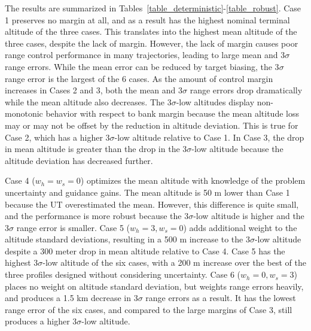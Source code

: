 \documentclass[journal ]{new-aiaa}
\begin{document}

The results are summarized in Tables~\ref{table_deterministic}-\ref{table_robust}. Case 1 preserves no margin at all, and as a result has the highest nominal terminal altitude of the three cases. This translates into the highest mean altitude of the three cases, despite the lack of margin. However, the lack of margin causes poor range control performance in many trajectories, leading to large mean and 3$\sigma$ range errors. While the mean error can be reduced by target biasing, the 3$\sigma$ range error is the largest of the 6 cases. As the amount of control margin increases in Cases 2 and 3, both the mean and 3$\sigma$ range errors drop dramatically while the mean altitude also decreases. The 3$\sigma$-low altitudes display non-monotonic behavior with respect to bank margin because the mean altitude loss may or may not be offset by the reduction in altitude deviation. This is true for Case 2, which has a higher 3$\sigma$-low altitude relative to Case 1. In Case 3, the drop in mean altitude is greater than the drop in the 3$\sigma$-low altitude because the altitude deviation has decreased further. 

Case 4 ($ w_h=w_s=0 $) optimizes the mean altitude with knowledge of the problem uncertainty and guidance gains. The mean altitude is 50 m lower than Case 1 because the UT overestimated the mean. However, this difference is quite small, and the performance is more robust because the 3$\sigma$-low altitude is higher and the 3$\sigma$ range error is smaller. Case 5 ($ w_h=3,w_s=0 $) adds additional weight to the altitude standard deviations, resulting in a 500 m increase to the 3$\sigma$-low altitude despite a 300 meter drop in mean altitude relative to Case 4. Case 5 has the highest 3$\sigma$-low altitude of the six cases, with a 200 m increase over the best of the three profiles designed without considering uncertainty. Case 6 ($ w_h=0, w_s=3$) places no weight on altitude standard deviation, but weights range errors heavily, and produces a 1.5 km decrease in 3$\sigma$ range errors as a result. It has the lowest range error of the six cases, and compared to the large margins of Case 3, still produces a higher 3$\sigma$-low altitude.
\end{document}
